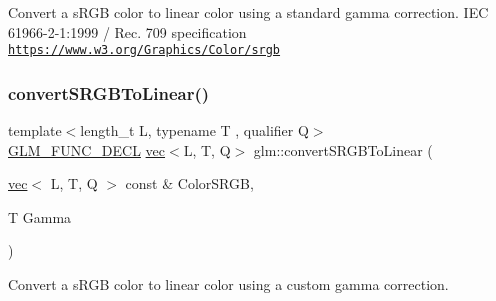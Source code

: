 Convert a s\+R\+GB color to linear color using a standard gamma correction. I\+EC 61966-\/2-\/1\+:1999 / Rec. 709 specification \href{https://www.w3.org/Graphics/Color/srgb}{\tt https\+://www.\+w3.\+org/\+Graphics/\+Color/srgb} \mbox{\label{group__gtc__color__space_gad1b91f27a9726c9cb403f9fee6e2e200}} 
\subsubsection{\texorpdfstring{convert\+S\+R\+G\+B\+To\+Linear()}{convertSRGBToLinear()}\hspace{0.1cm}{\footnotesize\ttfamily [2/2]}}
{\footnotesize\ttfamily template$<$length\+\_\+t L, typename T , qualifier Q$>$ \\
\mbox{\hyperlink{setup_8hpp_ab2d052de21a70539923e9bcbf6e83a51}{G\+L\+M\+\_\+\+F\+U\+N\+C\+\_\+\+D\+E\+CL}} \mbox{\hyperlink{structglm_1_1vec}{vec}}$<$L, T, Q$>$ glm\+::convert\+S\+R\+G\+B\+To\+Linear (\begin{DoxyParamCaption}\item[{\mbox{\hyperlink{structglm_1_1vec}{vec}}$<$ L, T, Q $>$ const \&}]{Color\+S\+R\+GB,  }\item[{T}]{Gamma }\end{DoxyParamCaption})}



Convert a s\+R\+GB color to linear color using a custom gamma correction. 

